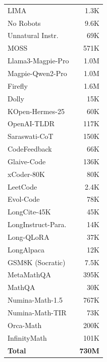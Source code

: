 \begin{table}[!h]
\begin{minipage}[t]{0.245\textwidth}
\begin{tabular}{lr}
LIMA~\cite{zhou2023lima} & 1.3K \\
No Robots~\cite{rajani2023no_robots} & 9.6K \\
Unnatural Instr.~\cite{honovich2023unnatural} & 69K \\
MOSS~\cite{sun2024moss} & 571K \\
Llama3-Magpie-Pro~\cite{xu2024magpie} & 1.0M \\
Magpie-Qwen2-Pro~\cite{xu2024magpie} & 1.0M \\
Firefly~\cite{yang2023firefly} & 1.6M \\
Dolly~\cite{conover2023dolly} & 15K \\
KOpen-Hermes-25~\cite{kopenhermes2024} & 60K \\
OpenAI-TLDR~\cite{stiennon2020learning} & 117K \\
Saraswati-CoT~\cite{saraswaticot2024} & 150K \\
CodeFeedback~\cite{zheng2024opencodeinterpreter} & 66K \\
Glaive-Code~\cite{glaive2023} & 136K \\
xCoder-80K~\cite{wang2024xcoder} & 80K \\
LeetCode~\cite{leetcode2023} & 2.4K \\
Evol-Code~\cite{luo2024wizardcoder} & 78K \\
LongCite-45K~\cite{zhang2024longcite} & 45K \\
LongInstruct-Para.~\cite{longinstruct2024} & 14K \\
Long-QLoRA~\cite{yang2023longqlora} & 37K \\
LongAlpaca~\cite{chen2024longlora} & 12K \\
GSM8K (Socratic)~\cite{cobbe2021gsm8k} & 7.5K \\
MetaMathQA~\cite{yu2024metamath} & 395K \\
MathQA~\cite{amini2019mathqa} & 30K \\
Numina-Math-1.5~\cite{numina_math_15} & 767K \\
Numina-Math-TIR~\cite{numina_math_tir} & 73K \\
Orca-Math~\cite{mitra2024orcamath} & 200K \\
InfinityMath~\cite{zhang2024infinitymath} & 101K \\
\midrule
\textbf{Total} & \textbf{730M} \\
\bottomrule
\end{tabular}
\end{minipage}
\end{table}

